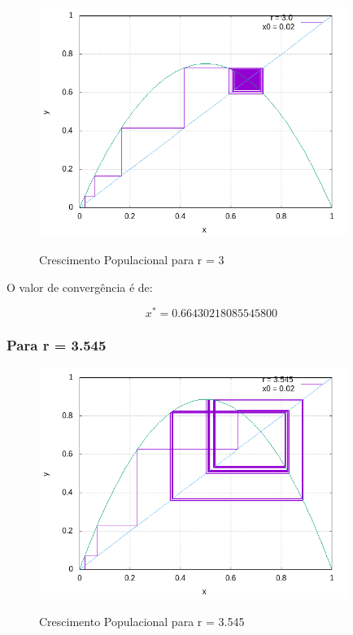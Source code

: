 \documentclass[a4paper, 12pt]{article}
\begin{document}
\begin{figure}[H]
	\centering
	\caption{Crescimento Populacional para r = 3}{}
	\includegraphics[width=10.0cm]{r=3_0__x0=0_02.png}
		\label{fig:img3}
\end{figure}

O valor de convergência é de: 


\begin{equation*}
	x^{*} = 0.66430218085545800
\end{equation*}


\hspace{0.5cm}

\subsubsection{Para r = 3.545}

\begin{figure}[H]
	\centering
	\caption{Crescimento Populacional para r = 3.545}{}
	\includegraphics[width=10.0cm]{r=3_545__x0=0_02.png}
	\label{fig:img4}
\end{figure}

\hspace{0.5cm}
\end{document}
